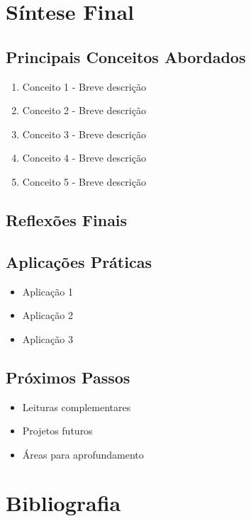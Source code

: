 \section{Síntese Final}

\subsection{Principais Conceitos Abordados}
\begin{enumerate}[leftmargin=*]
    \item Conceito 1 - Breve descrição
    \item Conceito 2 - Breve descrição
    \item Conceito 3 - Breve descrição
    \item Conceito 4 - Breve descrição
    \item Conceito 5 - Breve descrição
\end{enumerate}

\subsection{Reflexões Finais}

\subsection{Aplicações Práticas}
\begin{itemize}[leftmargin=*]
    \item Aplicação 1
    \item Aplicação 2
    \item Aplicação 3
\end{itemize}

\subsection{Próximos Passos}
\begin{itemize}[leftmargin=*]
    \item Leituras complementares
    \item Projetos futuros
    \item Áreas para aprofundamento
\end{itemize}

\section{Bibliografia}

